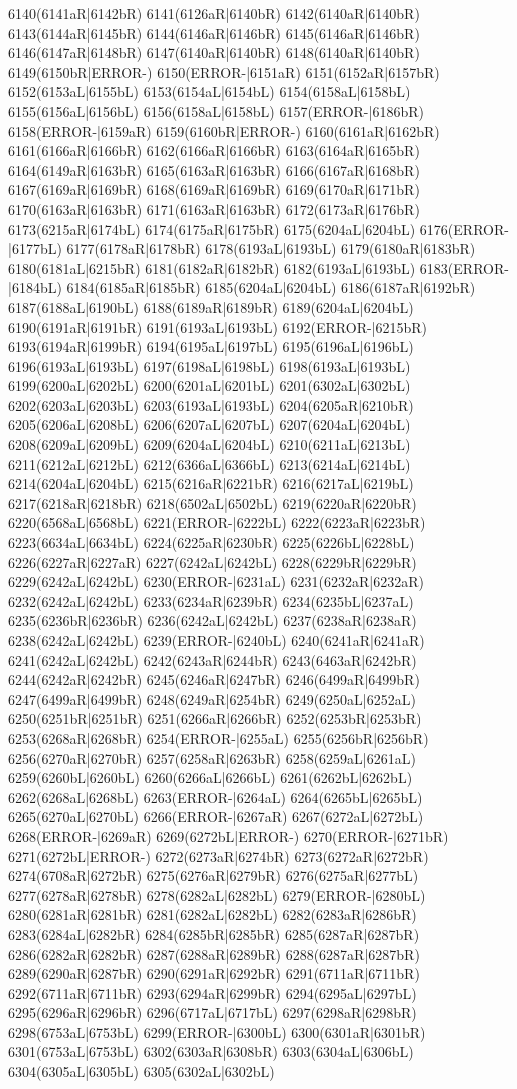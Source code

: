 6140(6141aR|6142bR) 6141(6126aR|6140bR) 6142(6140aR|6140bR) 6143(6144aR|6145bR) 6144(6146aR|6146bR) 6145(6146aR|6146bR) 6146(6147aR|6148bR) 6147(6140aR|6140bR) 6148(6140aR|6140bR) 6149(6150bR|ERROR-) 6150(ERROR-|6151aR) 6151(6152aR|6157bR) 6152(6153aL|6155bL) 6153(6154aL|6154bL) 6154(6158aL|6158bL) 6155(6156aL|6156bL) 6156(6158aL|6158bL) 6157(ERROR-|6186bR) 6158(ERROR-|6159aR) 6159(6160bR|ERROR-) 6160(6161aR|6162bR) 6161(6166aR|6166bR) 6162(6166aR|6166bR) 6163(6164aR|6165bR) 6164(6149aR|6163bR) 6165(6163aR|6163bR) 6166(6167aR|6168bR) 6167(6169aR|6169bR) 6168(6169aR|6169bR) 6169(6170aR|6171bR) 6170(6163aR|6163bR) 6171(6163aR|6163bR) 6172(6173aR|6176bR) 6173(6215aR|6174bL) 6174(6175aR|6175bR) 6175(6204aL|6204bL) 6176(ERROR-|6177bL) 6177(6178aR|6178bR) 6178(6193aL|6193bL) 6179(6180aR|6183bR) 6180(6181aL|6215bR) 6181(6182aR|6182bR) 6182(6193aL|6193bL) 6183(ERROR-|6184bL) 6184(6185aR|6185bR) 6185(6204aL|6204bL) 6186(6187aR|6192bR) 6187(6188aL|6190bL) 6188(6189aR|6189bR) 6189(6204aL|6204bL) 6190(6191aR|6191bR) 6191(6193aL|6193bL) 6192(ERROR-|6215bR) 6193(6194aR|6199bR) 6194(6195aL|6197bL) 6195(6196aL|6196bL) 6196(6193aL|6193bL) 6197(6198aL|6198bL) 6198(6193aL|6193bL) 6199(6200aL|6202bL) 6200(6201aL|6201bL) 6201(6302aL|6302bL) 6202(6203aL|6203bL) 6203(6193aL|6193bL) 6204(6205aR|6210bR) 6205(6206aL|6208bL) 6206(6207aL|6207bL) 6207(6204aL|6204bL) 6208(6209aL|6209bL) 6209(6204aL|6204bL) 6210(6211aL|6213bL) 6211(6212aL|6212bL) 6212(6366aL|6366bL) 6213(6214aL|6214bL) 6214(6204aL|6204bL) 6215(6216aR|6221bR) 6216(6217aL|6219bL) 6217(6218aR|6218bR) 6218(6502aL|6502bL) 6219(6220aR|6220bR) 6220(6568aL|6568bL) 6221(ERROR-|6222bL) 6222(6223aR|6223bR) 6223(6634aL|6634bL) 6224(6225aR|6230bR) 6225(6226bL|6228bL) 6226(6227aR|6227aR) 6227(6242aL|6242bL) 6228(6229bR|6229bR) 6229(6242aL|6242bL) 6230(ERROR-|6231aL) 6231(6232aR|6232aR) 6232(6242aL|6242bL) 6233(6234aR|6239bR) 6234(6235bL|6237aL) 6235(6236bR|6236bR) 6236(6242aL|6242bL) 6237(6238aR|6238aR) 6238(6242aL|6242bL) 6239(ERROR-|6240bL) 6240(6241aR|6241aR) 6241(6242aL|6242bL) 6242(6243aR|6244bR) 6243(6463aR|6242bR) 6244(6242aR|6242bR) 6245(6246aR|6247bR) 6246(6499aR|6499bR) 6247(6499aR|6499bR) 6248(6249aR|6254bR) 6249(6250aL|6252aL) 6250(6251bR|6251bR) 6251(6266aR|6266bR) 6252(6253bR|6253bR) 6253(6268aR|6268bR) 6254(ERROR-|6255aL) 6255(6256bR|6256bR) 6256(6270aR|6270bR) 6257(6258aR|6263bR) 6258(6259aL|6261aL) 6259(6260bL|6260bL) 6260(6266aL|6266bL) 6261(6262bL|6262bL) 6262(6268aL|6268bL) 6263(ERROR-|6264aL) 6264(6265bL|6265bL) 6265(6270aL|6270bL) 6266(ERROR-|6267aR) 6267(6272aL|6272bL) 6268(ERROR-|6269aR) 6269(6272bL|ERROR-) 6270(ERROR-|6271bR) 6271(6272bL|ERROR-) 6272(6273aR|6274bR) 6273(6272aR|6272bR) 6274(6708aR|6272bR) 6275(6276aR|6279bR) 6276(6275aR|6277bL) 6277(6278aR|6278bR) 6278(6282aL|6282bL) 6279(ERROR-|6280bL) 6280(6281aR|6281bR) 6281(6282aL|6282bL) 6282(6283aR|6286bR) 6283(6284aL|6282bR) 6284(6285bR|6285bR) 6285(6287aR|6287bR) 6286(6282aR|6282bR) 6287(6288aR|6289bR) 6288(6287aR|6287bR) 6289(6290aR|6287bR) 6290(6291aR|6292bR) 6291(6711aR|6711bR) 6292(6711aR|6711bR) 6293(6294aR|6299bR) 6294(6295aL|6297bL) 6295(6296aR|6296bR) 6296(6717aL|6717bL) 6297(6298aR|6298bR) 6298(6753aL|6753bL) 6299(ERROR-|6300bL) 6300(6301aR|6301bR) 6301(6753aL|6753bL) 6302(6303aR|6308bR) 6303(6304aL|6306bL) 6304(6305aL|6305bL) 6305(6302aL|6302bL) 